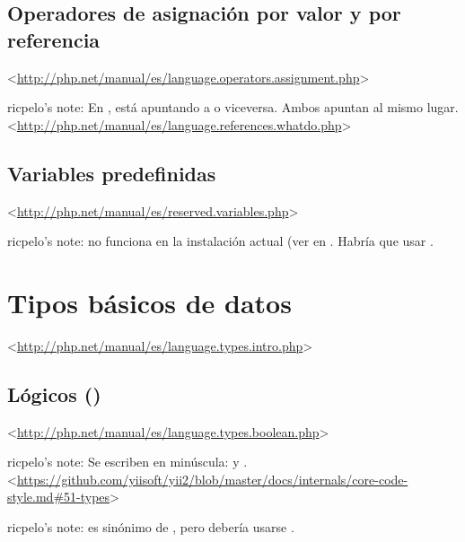 \documentclass[a4paper,11pt,spanish]{sphinxmanual}
\begin{document}
\subsection{Operadores de asignación por valor y por referencia}
\label{\detokenize{php:operadores-de-asignacion-por-valor-y-por-referencia}}
\textless{}\url{http://php.net/manual/es/language.operators.assignment.php}\textgreater{}

ricpelo's note: En ,   está apuntando a 
o viceversa. Ambos apuntan al mismo
lugar. \textless{}\url{http://php.net/manual/es/language.references.whatdo.php}\textgreater{}


\subsection{Variables predefinidas}
\label{\detokenize{php:variables-predefinidas}}
\textless{}\url{http://php.net/manual/es/reserved.variables.php}\textgreater{}

ricpelo's note:  no funciona en la instalación actual (ver
 en . Habría que usar .


\section{Tipos básicos de datos}
\label{\detokenize{php:tipos-basicos-de-datos}}
\textless{}\url{http://php.net/manual/es/language.types.intro.php}\textgreater{}


\subsection{Lógicos ()}
\label{\detokenize{php:logicos-bool}}
\textless{}\url{http://php.net/manual/es/language.types.boolean.php}\textgreater{}

\begin{DUlineblock}{0em}
\item[] ricpelo's note: Se escriben en minúscula:  y
. \textless{}\url{https://github.com/yiisoft/yii2/blob/master/docs/internals/core-code-style.md\#51-types}\textgreater{}
\item[] ricpelo's note:  es sinónimo de , pero debería
usarse .
\end{DUlineblock}
\end{document}

